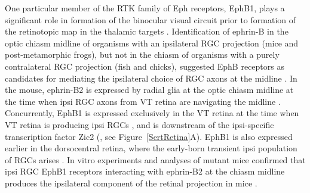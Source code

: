 One particular member of the RTK family of Eph receptors, EphB1, plays a significant role in formation of the binocular visual circuit prior to formation of the retinotopic map in the thalamic targets \cite{petros2008retinal}.
Identification of ephrin-B in the optic chiasm midline of organisms with an ipsilateral RGC projection (mice and post-metamorphic frogs), but not in the chiasm of organisms with a purely contralateral RGC projection (fish and chicks), suggested EphB receptors as candidates for mediating the ipsilateral choice of RGC axons at the midline \cite{nakagawa2000ephrin}.
In the mouse, ephrin-B2 is expressed by radial glia at the optic chiasm midline at the time when ipsi RGC axons from VT retina are navigating the midline \cite{williams2003ephrin}.
Concurrently, EphB1 is expressed exclusively in the VT retina at the time when VT retina is producing ipsi RGCs \cite{williams2003ephrin}, and is downstream of the ipsi-specific transcription factor Zic2 (, see Figure~\ref{SertRetina}A).
EphB1 is also expressed earlier in the dorsocentral retina, where the early-born transient ipsi population of RGCs arises \cite{williams2003ephrin,drager1985birth}.
In vitro experiments and analyses of mutant mice confirmed that ipsi RGC EphB1 receptors interacting with ephrin-B2 at the chiasm midline produces the ipsilateral component of the retinal projection in mice \cite{williams2003ephrin,petros2010ephrin,petros2009specificity,chenaux2011forward}.

